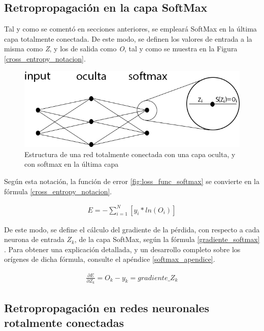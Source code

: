 \subsection{Retropropagación en la capa SoftMax} 

Tal y como se comentó en secciones anteriores, se empleará SoftMax en la última capa totalmente conectada. De este modo, se definen los valores de entrada a la misma como \textit{Z}, y los de salida como \textit{O}, tal y como se muestra en la Figura \ref{cross_entropy_notacion}.

\begin{figure}[H]
	\centering
	\includegraphics[scale=0.4]{imagenes/NN_softmax.jpg}  
	\caption{Estructura de una red totalmente conectada con una capa oculta, y con softmax en la última capa}
	\label{fig:nn_softmax_1_capa}
\end{figure}

Según esta notación, la función de error \ref{fig:loss_func_softmax} se convierte en la fórmula \ref{cross_entropy_notacion}.

\begin{gather}
	E = - \sum_{i=1}^{N}  [y_i * ln(O_i)] 
	\label{cross_entropy_notacion}
\end{gather}

De este modo, se define el cálculo del gradiente de la pérdida, con respecto a cada neurona de entrada $Z_k$, de la capa SoftMax, según la fórmula \ref{gradiente_softmax} \cite{Cross_entropy_backprop} \cite{Cross_entropy_backprop_grad_input}. Para obtener una explicación detallada, y un desarrollo completo sobre los orígenes de dicha fórmula, consulte el apéndice \ref{softmax_apendice}.

\begin{gather}
	\frac{\partial E}{\partial Z_k} = O_k - y_k = gradiente\_Z_k
	\label{gradiente_softmax}
\end{gather}


\subsection{Retropropagación en redes neuronales rotalmente conectadas}


